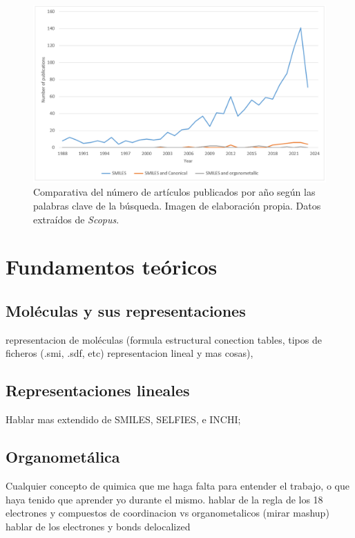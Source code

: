 \begin{figure}[h!]
        \centering
        \includegraphics[scale=0.5]{imagenes/estado_arte/revisionBibliografica.png}
        \caption{Comparativa del número de artículos publicados por año según las palabras clave de la búsqueda. Imagen de elaboración propia. Datos extraídos de \emph{Scopus}.}
        \label{fig:revisionBibliografica}
    \end{figure}


\section{Fundamentos teóricos}

\subsection{Moléculas y sus representaciones}
representacion de moléculas (formula estructural conection tables, tipos de ficheros (.smi, .sdf, etc) representacion lineal y mas cosas),

\subsection{Representaciones lineales}
Hablar mas extendido de SMILES, SELFIES, e INCHI;

\subsection{Organometálica}
Cualquier concepto de quimica que me haga falta para entender el trabajo, o que haya tenido que aprender yo durante el mismo.
hablar de la regla de los 18 electrones y compuestos de coordinacion vs organometalicos
(mirar mashup)
hablar de los electrones y bonds delocalized

